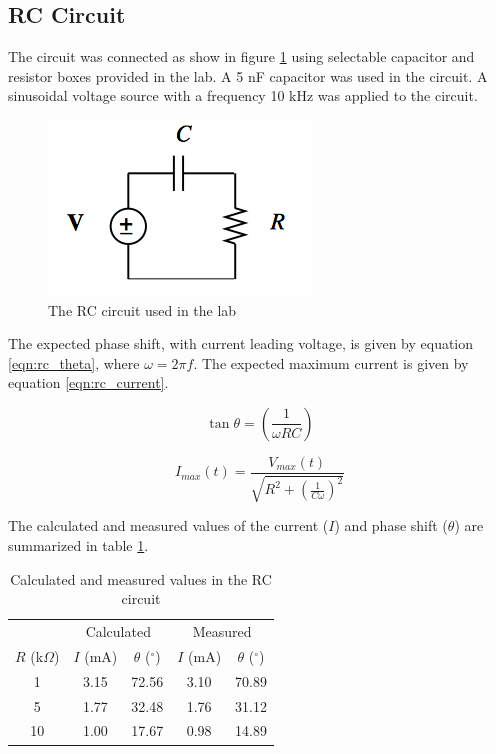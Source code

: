 \documentclass[12pt]{article}
\begin{document}
\subsection{RC Circuit}\label{sec:rc}
The circuit was connected as show in figure \ref{fig:rc} using selectable capacitor and resistor boxes provided in the lab. A 5 nF capacitor was used in the circuit. A sinusoidal voltage source with a frequency 10 kHz was applied to the circuit.

\begin{figure}[h]
	\centering
	\includegraphics[scale=0.6]{RC_circuit}
	\caption{The RC circuit used in the lab}
	\label{fig:rc}
\end{figure}

The expected phase shift, with current leading voltage, is given by equation \eqref{eqn:rc_theta}, where $\omega = 2\pi f$. The expected maximum current is given by equation \eqref{eqn:rc_current}.

\begin{equation}
	\tan { \theta  } =\left( \frac { 1 }{ \omega RC }  \right) 
	\label{eqn:rc_theta}
\end{equation}

\begin{equation}
		I_{max}(t) = \frac{V_{max}(t)}{\sqrt{R^2 + (\frac{1}{C\omega})^2} }
		\label{eqn:rc_current}
\end{equation}

\pagebreak
The calculated and measured values of the current ($I$) and phase shift ($\theta$) are summarized in table \ref{table:rc}.

\begin{table}[h]
	\centering
	\begin{tabular}{c c c c c}
		\toprule
		&				\multicolumn{2}{c}{Calculated}	& \multicolumn{2}{c}{Measured}	\\
		\cline{2-5}
		$R$ (k$\Omega$)	& $I$ (mA) 	& $\theta$ ($^\circ$) 	& $I$ (mA) 	& $\theta$ ($^\circ$) \\
		\hline
		1				& 3.15		& 72.56					& 3.10			&	70.89	\\
		5				& 1.77		& 32.48					& 1.76			&	31.12	\\
		10				& 1.00		& 17.67					& 0.98			&	14.89	\\
		\toprule
	\end{tabular}
	\caption{Calculated and measured values in the RC circuit}
	\label{table:rc}
\end{table}
\end{document}
